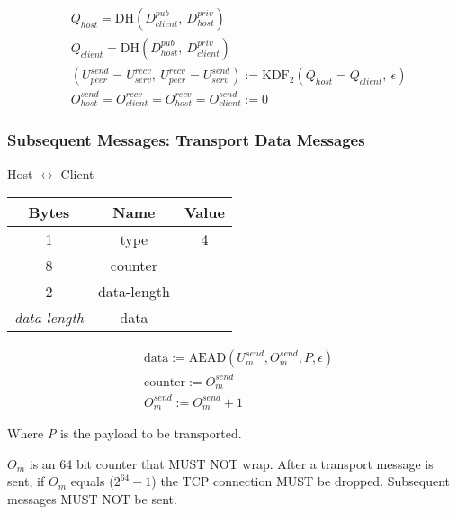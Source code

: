 \begin{align*}
    & Q_{host} = \text{DH}(D_{client}^{pub},\ D_{host}^{priv})\\
    & Q_{client} = \text{DH}(D_{host}^{pub},\ D_{client}^{priv})\\
    & (U_{peer}^{send} = U_{serv}^{recv},\ U_{peer}^{recv} = U_{serv}^{send}) := \text{KDF}_2(Q_{host} = Q_{client},
    \ \epsilon) \\
    & O_{host}^{send} = O_{client}^{recv} = O_{host}^{recv} = O_{client}^{send} := 0
\end{align*}

\subsubsection{Subsequent Messages: Transport Data Messages}

\begin{center}
    Host $\leftrightarrow$ Client\\
    \begin{tabular}{|c|c|c|}
        \hline
        \textbf{Bytes}     & \textbf{Name} & \textbf{Value} \\
        \hline
        1                  & type          & 4              \\
        \hline
        8                  & counter       &                \\
        \hline
        2                  & data-length   &                \\
        \hline
        \emph{data-length} & data          &                \\
        \hline
    \end{tabular}
\end{center}

\begin{align*}
    & \text{data} := \text{AEAD}(U_{m}^{send}, O_{m}^{send}, P, \epsilon)\\
    & \text{counter} := O_{m}^{send}\\
    & O_{m}^{send} := O_{m}^{send} + 1
\end{align*}


Where \emph{P} is the payload to be transported.

$O_{m}$ is an 64 bit counter that MUST NOT wrap. After a transport message is sent, if $O_{m}$ equals
($2^{64}-1$) the TCP connection MUST be dropped. Subsequent messages MUST NOT be sent. \\

